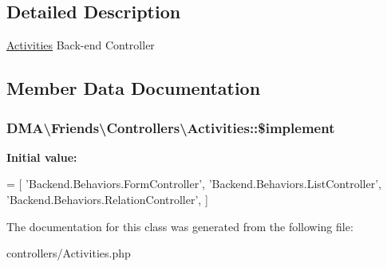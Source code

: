 \subsection{Detailed Description}
\hyperlink{classDMA_1_1Friends_1_1Controllers_1_1Activities}{Activities} Back-\/end Controller 

\subsection{Member Data Documentation}
\hypertarget{classDMA_1_1Friends_1_1Controllers_1_1Activities_aff57941f0ab53e417ce578994badc87f}{
\subsubsection[{\$implement}]{\setlength{\rightskip}{0pt plus 5cm}D\+M\+A\textbackslash{}\+Friends\textbackslash{}\+Controllers\textbackslash{}\+Activities\+::\$implement}}\label{classDMA_1_1Friends_1_1Controllers_1_1Activities_aff57941f0ab53e417ce578994badc87f}
{\bfseries Initial value\+:}
\begin{DoxyCode}
= [
        \textcolor{stringliteral}{'Backend.Behaviors.FormController'},
        \textcolor{stringliteral}{'Backend.Behaviors.ListController'},
        \textcolor{stringliteral}{'Backend.Behaviors.RelationController'},
    ]
\end{DoxyCode}


The documentation for this class was generated from the following file\+:\begin{DoxyCompactItemize}
\item 
controllers/Activities.\+php\end{DoxyCompactItemize}
